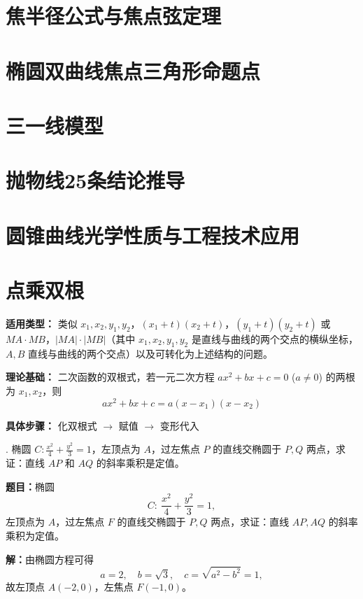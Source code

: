 \documentclass{ctexart}
\begin{document}
\section{焦半径公式与焦点弦定理}

\section{椭圆双曲线焦点三角形命题点}

\section{三一线模型}

\section{抛物线25条结论推导}

\section{圆锥曲线光学性质与工程技术应用}

\section{点乘双根}

\textbf{适用类型：} 类似 \( x_1, x_2, y_1, y_2 \)，\( (x_1 + t)(x_2 + t) \)，\( (y_1 + t)(y_2 + t) \) 或 \( MA \cdot MB \)，\( |MA| \cdot |MB| \)（其中 \( x_1, x_2, y_1, y_2 \) 是直线与曲线的两个交点的横纵坐标，\( A, B \) 直线与曲线的两个交点）以及可转化为上述结构的问题。

\textbf{理论基础：} 二次函数的双根式，若一元二次方程 \( ax^2 + bx + c = 0 \) (\( a \neq 0 \)) 的两根为 \( x_1, x_2 \)，则
\[
ax^2 + bx + c = a(x - x_1)(x - x_2)
\]

\textbf{具体步骤：} 化双根式 $\rightarrow$ 赋值 $\rightarrow$ 变形代入

. 椭圆 \( C: \frac{x^2}{4} + \frac{y^2}{3} = 1 \)，左顶点为 \( A \)，过左焦点 \( P \) 的直线交椭圆于 \( P, Q \) 两点，求证：直线 \( AP \) 和 \( AQ \) 的斜率乘积是定值。
	

\textbf{题目：}椭圆
\[
C:\ \frac{x^{2}}{4}+\frac{y^{2}}{3}=1,
\]
左顶点为 $A$，过左焦点 $F$ 的直线交椭圆于 $P,Q$ 两点，求证：直线 $AP, AQ$ 的斜率乘积为定值。

\textbf{解：}由椭圆方程可得
\[
a=2,\quad b=\sqrt3,\quad c=\sqrt{a^{2}-b^{2}}=1,
\]
故左顶点 $A(-2,0)$，左焦点 $F(-1,0)$。
\end{document}
